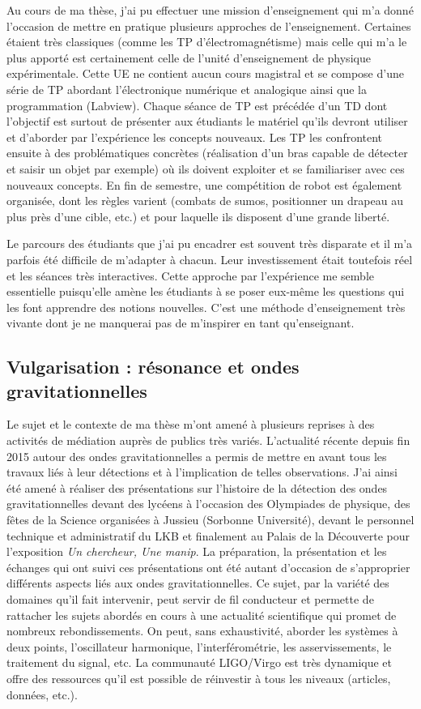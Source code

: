 \documentclass[12pt,a4paper]{article}
\begin{document}
Au cours de ma thèse, j'ai pu effectuer une mission d'enseignement qui m'a donné l'occasion de mettre en pratique plusieurs approches de l'enseignement.
Certaines étaient très classiques (comme les TP d'électromagnétisme) mais celle qui m'a le plus apporté est certainement celle de l'unité d'enseignement de physique expérimentale.
Cette UE ne contient aucun cours magistral et se compose d'une série de TP abordant l'électronique numérique et analogique ainsi que la programmation (Labview).
Chaque séance de TP est précédée d'un TD dont l'objectif est surtout de présenter aux étudiants le matériel qu'ils devront utiliser et d'aborder par l'expérience les concepts nouveaux.
Les TP les confrontent ensuite à des problématiques concrètes (réalisation d'un bras capable de détecter et saisir un objet par exemple) où ils doivent exploiter et se familiariser avec ces nouveaux concepts.
En fin de semestre, une compétition de robot est également organisée, dont les règles varient (combats de \og sumos\fg{}, positionner un drapeau au plus près d'une cible, etc.) et pour laquelle ils disposent d'une grande liberté.

Le parcours des étudiants que j'ai pu encadrer est souvent très disparate et il m'a parfois été difficile de m'adapter à chacun.
Leur investissement était toutefois réel et les séances très interactives.
Cette approche par l'expérience me semble essentielle puisqu'elle amène les étudiants à se poser eux-même les questions qui les font apprendre des notions nouvelles.
C'est une méthode d'enseignement très vivante dont je ne manquerai pas de m'inspirer en tant qu'enseignant.

\subsection{Vulgarisation : résonance et ondes gravitationnelles}

Le sujet et le contexte de ma thèse m'ont amené à plusieurs reprises à des activités de médiation auprès de publics très variés.
L'actualité récente depuis fin 2015 autour des ondes gravitationnelles a permis de mettre en avant tous les travaux liés à leur détections et à l'implication de telles observations.
J'ai ainsi été amené à réaliser des présentations sur l'histoire de la détection des ondes gravitationnelles devant des lycéens à l'occasion des Olympiades de physique, des fêtes de la Science organisées à Jussieu (Sorbonne Université), devant le personnel technique et administratif du LKB et finalement au Palais de la Découverte pour l'exposition \textit{Un chercheur, Une manip}.
La préparation, la présentation et les échanges qui ont suivi ces présentations ont été autant d'occasion de s'approprier différents aspects liés aux ondes gravitationnelles.
Ce sujet, par la variété des domaines qu'il fait intervenir, peut servir de fil conducteur et permette de rattacher les sujets abordés en cours à une actualité scientifique  qui promet de nombreux rebondissements.
On peut, sans exhaustivité, aborder les systèmes à deux points, l'oscillateur harmonique, l'interférométrie, les asservissements, le traitement du signal, etc.
La communauté LIGO/Virgo est très dynamique et offre des ressources qu'il est possible de réinvestir à tous les niveaux (articles, données, etc.).
\end{document}

